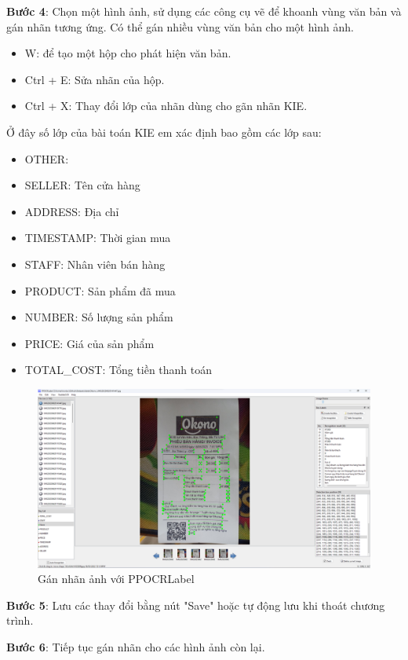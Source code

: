 \textbf{Bước 4}: Chọn một hình ảnh, sử dụng các công cụ vẽ để khoanh vùng văn bản và gán nhãn tương ứng. Có thể gán nhiều vùng văn bản cho một hình ảnh.
\begin{itemize}
    \item W: để tạo một hộp cho phát hiện văn bản.
    \item Ctrl + E: Sửa nhãn của hộp.
    \item Ctrl + X: Thay đổi lớp của nhãn dùng cho gãn nhãn KIE.
\end{itemize}
Ở đây số lớp của bài toán KIE em xác định bao gồm các lớp sau:
\begin{itemize}
    \item OTHER: 
    \item SELLER: Tên cửa hàng
    \item ADDRESS: Địa chỉ 
    \item TIMESTAMP: Thời gian mua
    \item STAFF: Nhân viên bán hàng
    \item PRODUCT: Sản phẩm đã mua
    \item NUMBER: Số lượng sản phẩm
    \item PRICE: Giá của sản phẩm
    \item TOTAL\_COST: Tổng tiền thanh toán
\end{itemize}
\begin{figure}[h]
    \includegraphics[scale=0.26]{images/GUI-ppocr-labeled.png}
    \centering
    \caption{Gán nhãn ảnh với PPOCRLabel}
\end{figure}

\textbf{Bước 5}: Lưu các thay đổi bằng nút "Save" hoặc tự động lưu khi thoát chương trình.

\textbf{Bước 6}: Tiếp tục gán nhãn cho các hình ảnh còn lại.

